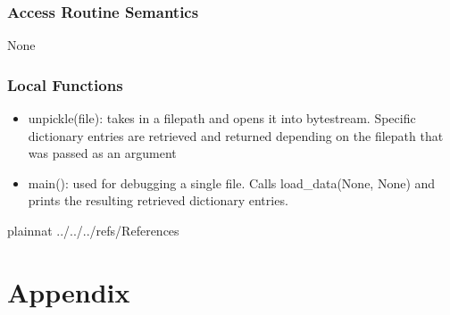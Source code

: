 \documentclass[12pt, titlepage]{article}
\begin{document}
\subsubsection{Access Routine Semantics}

None

\subsubsection{Local Functions}
\begin{itemize}
\item{unpickle(file): takes in a filepath and opens it into bytestream. Specific dictionary entries are retrieved and returned depending on the filepath that was passed as an argument}

\item{main(): used for debugging a single file. Calls load\_data(None, None) and prints the resulting retrieved dictionary entries. }
\end{itemize}
\newpage

 {plainnat}
 {../../../refs/References}

\newpage

\section{Appendix} \label{Appendix}

\end{document}
